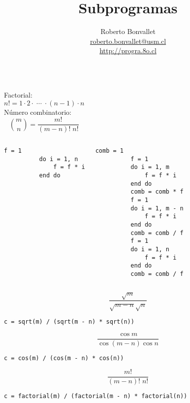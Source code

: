 \documentclass[10pt]{beamer}
\title{Subprogramas}
\author{
  Roberto Bonvallet \\
  \url{roberto.bonvallet@usm.cl} \\
  \url{http://progra.8o.cl}
}
\begin{document}
  \begin{frame}
    \maketitle
  \end{frame}

  \begin{frame}[fragile]
    \begin{columns}
        Factorial:
        \[ n! = 1\cdot2\cdot\;\cdots\;\cdot(n - 1)\cdot n \]
        Número combinatorio:
        \[ \binom{m}{n} = \frac{m!}{(m - n)!\;n!} \]
    \end{columns}

    \begin{columns}
      \pause
        \begin{lstlisting}[gobble=10,frame=single]
          f = 1
          do i = 1, n
              f = f * i
          end do
        \end{lstlisting}

      \pause
        \begin{lstlisting}[gobble=10,frame=single]
          comb = 1
          f = 1
          do i = 1, m
              f = f * i
          end do
          comb = comb * f
          f = 1
          do i = 1, m - n
              f = f * i
          end do
          comb = comb / f
          f = 1
          do i = 1, n
              f = f * i
          end do
          comb = comb / f
        \end{lstlisting}
    \end{columns}
    
\end{frame}

  \begin{frame}[fragile]
    \[ \frac{\sqrt{m}}{\sqrt{m - n} \sqrt{n}} \]
    \begin{lstlisting}[gobble=6,frame=single]
      c = sqrt(m) / (sqrt(m - n) * sqrt(n))
    \end{lstlisting}

    \[ \frac{\cos{m}}{\cos{(m - n)} \cos{n}} \]
    \begin{lstlisting}[gobble=6,frame=single]
      c = cos(m) / (cos(m - n) * cos(n))
    \end{lstlisting}

    \[ \frac{m!}{(m - n)!\;n!} \] \pause
    \begin{lstlisting}[gobble=6,frame=single]
      c = factorial(m) / (factorial(m - n) * factorial(n))
    \end{lstlisting}
\end{frame}
\end{document}
